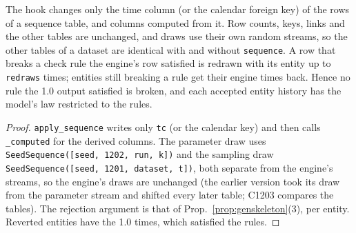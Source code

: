 \begin{proposition}\label{prop:tshook}
The hook changes only the time column (or the calendar foreign key) of the rows of a sequence table, and columns
computed from it. Row counts, keys, links and the other tables are unchanged, and draws use their own random
streams, so the other tables of a dataset are identical with and without \texttt{sequence}. A row that breaks a check
rule the engine's row satisfied is redrawn with its entity up to \texttt{redraws} times; entities still breaking a
rule get their engine times back. Hence no rule the 1.0 output satisfied is broken, and each accepted entity history
has the model's law restricted to the rules.
\end{proposition}
\begin{proof}
\texttt{apply\_sequence} writes only \texttt{tc} (or the calendar key) and then calls \texttt{\_computed} for the
derived columns. The parameter draw uses \texttt{SeedSequence([seed, 1202, run, k])} and the sampling draw
\texttt{SeedSequence([seed, 1201, dataset, t])}, both separate from the engine's streams, so the engine's draws are
unchanged (the earlier version took its draw from the parameter stream and shifted every later table; C1203 compares
the tables). The rejection argument is that of Prop.~\ref{prop:genskeleton}(3), per entity. Reverted entities have
the 1.0 times, which satisfied the rules.
\end{proof}

